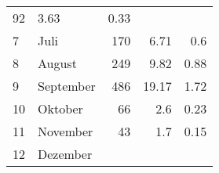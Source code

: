 \begin{longtable}{lXrrr}
       \num{92} &
       \num[round-mode=places,round-precision=2]{3,63} &
         \num[round-mode=places,round-precision=2]{0,33} \\

     7 &
     \multicolumn{1}{X}{ Juli   } &


       \num{170} &
       \num[round-mode=places,round-precision=2]{6,71} &
         \num[round-mode=places,round-precision=2]{0,6} \\

     8 &
     \multicolumn{1}{X}{ August   } &


       \num{249} &
       \num[round-mode=places,round-precision=2]{9,82} &
         \num[round-mode=places,round-precision=2]{0,88} \\

     9 &
     \multicolumn{1}{X}{ September   } &


       \num{486} &
       \num[round-mode=places,round-precision=2]{19,17} &
         \num[round-mode=places,round-precision=2]{1,72} \\

     10 &
     \multicolumn{1}{X}{ Oktober   } &


       \num{66} &
       \num[round-mode=places,round-precision=2]{2,6} &
         \num[round-mode=places,round-precision=2]{0,23} \\

     11 &
     \multicolumn{1}{X}{ November   } &


       \num{43} &
       \num[round-mode=places,round-precision=2]{1,7} &
         \num[round-mode=places,round-precision=2]{0,15} \\

     12 &
     \multicolumn{1}{X}{ Dezember   } &



\end{longtable}
